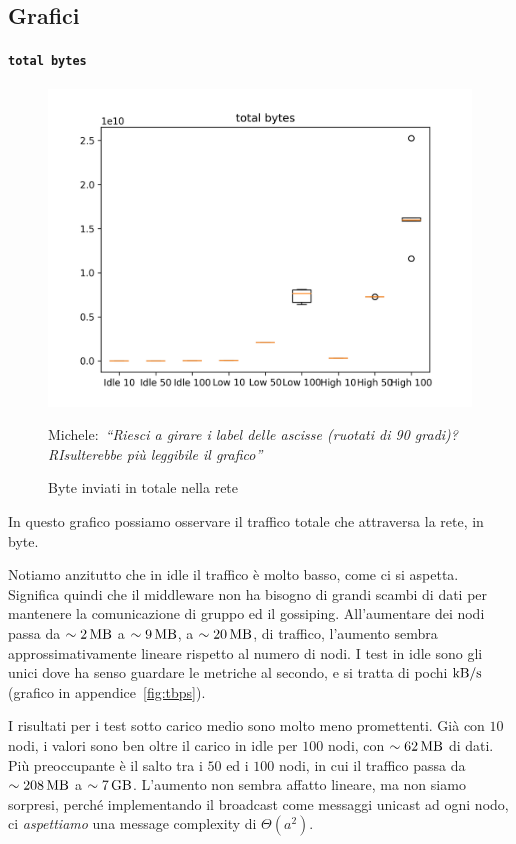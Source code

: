 \documentclass[12pt, a4paper]{article}
\newcommand{\michele}[1]{{\color{red}Michele:~}{\itshape``{#1}''}}
\begin{document}
\subsection{Grafici}

\paragraph{\lstinline{total bytes}}

\begin{figure}[H]
    \includegraphics[width=\linewidth, keepaspectratio]{graphs/total bytes.png}
    \caption{Byte inviati in totale nella rete}\michele{Riesci a girare i label delle ascisse (ruotati di 90 gradi)? RIsulterebbe più leggibile il grafico}
    \label{fig:tb}
\end{figure}

In questo grafico possiamo osservare il traffico totale che attraversa la rete, in byte.

Notiamo anzitutto che in idle il traffico è molto basso, come ci si aspetta. Significa quindi che il middleware non ha bisogno di grandi scambi di dati per mantenere la comunicazione di gruppo ed il gossiping.
All'aumentare dei nodi passa da $\sim\qty{2}{\mega\byte}$ a $\sim\qty{9}{\mega\byte}$, a $\sim\qty{20}{\mega\byte}$, di traffico, l'aumento sembra approssimativamente lineare rispetto al numero di nodi.
I test in idle sono gli unici dove ha senso guardare le metriche al secondo, e si tratta di pochi $\unit{\kilo\byte/\second}$ (grafico in appendice~\ref{fig:tbps}).

I risultati per i test sotto carico medio sono molto meno promettenti. Già con $10$ nodi, i valori sono ben oltre il carico in idle per $100$ nodi, con $\sim\qty{62}{\mega\byte}$ di dati.\\
Più preoccupante è il salto tra i $50$ ed i $100$ nodi, in cui il traffico passa da $\sim\qty{208}{\mega\byte}$ a $\sim\qty{7}{\giga\byte}$. L'aumento non sembra affatto lineare, ma non siamo sorpresi, perché implementando il broadcast come messaggi unicast ad ogni nodo, ci \emph{aspettiamo} una message complexity di $\Theta(a^2)$.
\end{document}

